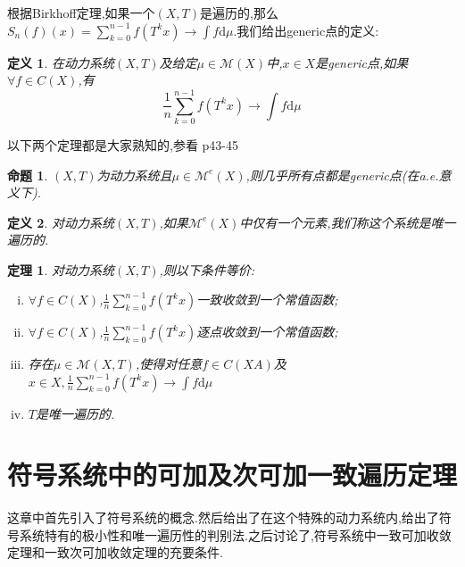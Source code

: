 \documentclass[a4paper,11pt,oneside]{book}
\newtheorem{theorem}{\textbf{\hspace{0.7cm}定理}}[section]
\newtheorem{definition}{\textbf{\hspace{0.7cm}定义}}[section]
\newtheorem{proposition}{\textbf{\hspace{0.7cm}命题}}[section]
\begin{document}
根据Birkhoff定理,如果一个$(X,T)$是遍历的,那么$S_n(f)(x)=\sum_{k=0}^{n-1}f(T^kx)\rightarrow \int f \mathrm d \mu$.我们给出generic点的定义:

\begin{definition}
在动力系统$(X,T)$及给定$\mu\in\mathcal{M}(X)$中,$x\in X$是generic点,如果$\forall f\in C(X)$,有
$$\frac{1}{n}\sum_{k=0}^{n-1}f(T^kx)\rightarrow \int f\mathrm d \mu$$
\end{definition}

以下两个定理都是大家熟知的,参看\cite{hy} p43-45


\begin{proposition}
$(X,T)$为动力系统且$\mu\in\mathcal{M}^e(X)$,则几乎所有点都是generic点(在a.e.意义下).
\end{proposition}


\begin{definition}
对动力系统$(X,T)$,如果$\mathcal{M}^e(X)$中仅有一个元素,我们称这个系统是唯一遍历的.
\end{definition}

\begin{theorem}
对动力系统$(X,T)$,则以下条件等价:
\begin{enumerate}[(i)]
\item $\forall f\in C(X)$,$\frac{1}{n}\sum_{k=0}^{n-1}f(T^kx)$一致收敛到一个常值函数;
\item $\forall f\in C(X)$,$\frac{1}{n}\sum_{k=0}^{n-1}f(T^kx)$逐点收敛到一个常值函数;
\item 存在$\mu\in\mathcal{M}(X,T)$,使得对任意$f\in C(XA)$及$x\in X,\frac{1}{n}\sum_{k=0}^{n-1}f(T^kx)\rightarrow \int f \mathrm d \mu$
\item $T$是唯一遍历的.
\end{enumerate}
\end{theorem}

\chapter{符号系统中的可加及次可加一致遍历定理}
\thispagestyle{fancy}
这章中首先引入了符号系统的概念.然后给出了在这个特殊的动力系统内,给出了符号系统特有的极小性和唯一遍历性的判别法.之后讨论了,符号系统中一致可加收敛定理和一致次可加收敛定理的充要条件.
\end{document}
